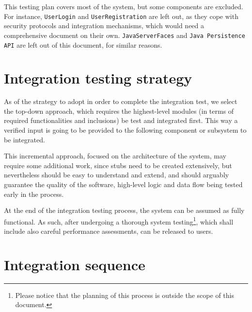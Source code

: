 This testing plan covers most of the system, but some components are excluded. For instance, \texttt{User\-Login} and \texttt{User\-Registration} are left out, as they cope with security protocols and integration mechanisms, which would need a comprehensive document on their own. \texttt{Java\-Server\-Faces} and \texttt{Java Persistence API} are left out of this document, for similar reasons.



\section{Integration testing strategy}
As of the strategy to adopt in order to complete the integration test, we select the \mbox{top-down} approach, which requires the \mbox{highest-level} modules (in terms of required functionalities and inclusions) be test and integrated first. This way a verified input is going to be provided to the following component or subsystem to be integrated.

This incremental approach, focused on the architecture of the system, may require some additional work, since stubs need to be created extensively, but nevertheless should be easy to understand and extend, and should arguably guarantee the quality of the software, \mbox{high-level} logic and data flow being tested early in the process.

At the end of the integration testing process, the system can be assumed as fully functional. As such, after undergoing a thorough system testing\footnote{Please notice that the planning of this process is outside the scope of this document.}, which shall include also careful performance assessments, can be released to users.





\section{Integration sequence}

